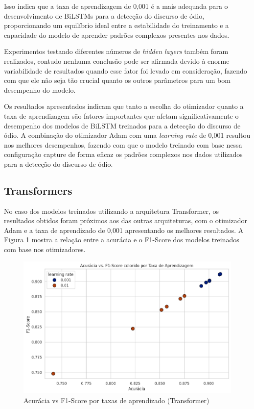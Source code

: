 \documentclass[conference]{IEEEtran}
\begin{document}
Isso indica que a taxa de aprendizagem de 0,001 é a mais adequada para o desenvolvimento de BiLSTMs para a detecção do discurso de ódio, proporcionando um equilíbrio ideal entre a estabilidade do treinamento e a capacidade do modelo de aprender padrões complexos presentes nos dados.

Experimentos testando diferentes números de \textit{hidden layers} também foram realizados, contudo nenhuma conclusão pode ser afirmada devido à enorme variabilidade de resultados quando esse fator foi levado em consideração, fazendo com que ele não seja tão crucial quanto os outros parâmetros para um bom desempenho do modelo.

Os resultados apresentados indicam que tanto a escolha do otimizador quanto a taxa de aprendizagem são fatores importantes que afetam significativamente o desempenho dos modelos de BiLSTM treinados para a detecção do discurso de ódio. A combinação do otimizador Adam com uma \textit{learning rate} de 0,001 resultou nos melhores desempenhos, fazendo com que o modelo treinado com base nessa configuração capture de forma eficaz os padrões complexos nos dados utilizados para a detecção do discurso de ódio.

\subsection{Transformers}

No caso dos modelos treinados utilizando a arquitetura Transformer, os resultados obtidos foram próximos aos das outras arquiteturas, com o otimizador Adam e a taxa de aprendizado de 0,001 apresentando os melhores resultados. A Figura \ref{fig:transformer_acu_lr} mostra a relação entre a acurácia e o F1-Score dos modelos treinados com base nos otimizadores.

\begin{figure}[h!]
    \centering
    \includegraphics[width=\linewidth]{images/transformer_acu_lr.png}
    \caption{Acurácia vs F1-Score por taxas de aprendizado (Transformer)}
    \label{fig:transformer_acu_lr}
\end{figure}
\end{document}
